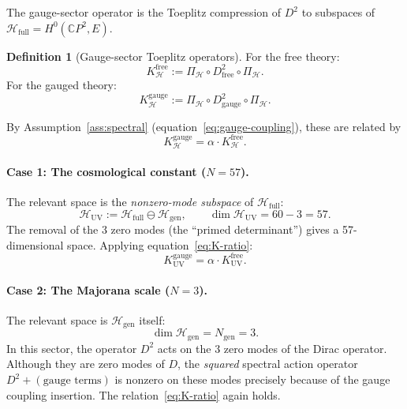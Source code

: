 \documentclass[11pt]{article}
\theoremstyle{definition}
\newtheorem{definition}[theorem]{Definition}
\theoremstyle{remark}
\newcommand{\CP}{\mathbb{C}P}
\begin{document}
The gauge-sector operator is the Toeplitz compression of $D^2$ to
subspaces of $\mathcal{H}_{\mathrm{full}} = H^0(\CP^2, E)$.

\begin{definition}[Gauge-sector Toeplitz operators]
\label{def:gauge-ops}
For the free theory:
\begin{equation}
K^{\mathrm{free}}_{\mathcal{H}} := \Pi_{\mathcal{H}} \circ D^2_{\mathrm{free}}
\circ \Pi_{\mathcal{H}}.
\end{equation}
For the gauged theory:
\begin{equation}
K^{\mathrm{gauge}}_{\mathcal{H}} := \Pi_{\mathcal{H}} \circ D^2_{\mathrm{gauge}}
\circ \Pi_{\mathcal{H}}.
\end{equation}
\end{definition}

By Assumption~\ref{ass:spectral} (equation~\eqref{eq:gauge-coupling}),
these are related by
\begin{equation}
\label{eq:K-ratio}
K^{\mathrm{gauge}}_{\mathcal{H}} = \alpha \cdot K^{\mathrm{free}}_{\mathcal{H}}.
\end{equation}

\paragraph{Case 1: The cosmological constant ($N = 57$).}
The relevant space is the \textit{nonzero-mode subspace} of
$\mathcal{H}_{\mathrm{full}}$:
\begin{equation}
\mathcal{H}_{\mathrm{UV}} := \mathcal{H}_{\mathrm{full}}
\ominus \mathcal{H}_{\mathrm{gen}},
\qquad \dim \mathcal{H}_{\mathrm{UV}} = 60 - 3 = 57.
\end{equation}
The removal of the 3 zero modes (the ``primed determinant'') gives a
57-dimensional space. Applying equation~\eqref{eq:K-ratio}:
\begin{equation}
K^{\mathrm{gauge}}_{\mathrm{UV}} = \alpha \cdot K^{\mathrm{free}}_{\mathrm{UV}}.
\end{equation}

\paragraph{Case 2: The Majorana scale ($N = 3$).}
The relevant space is $\mathcal{H}_{\mathrm{gen}}$ itself:
\begin{equation}
\dim \mathcal{H}_{\mathrm{gen}} = N_{\mathrm{gen}} = 3.
\end{equation}
In this sector, the operator $D^2$ acts on the 3 zero modes of the
Dirac operator. Although they are zero modes of $D$, the
\textit{squared} spectral action operator $D^2 + (\text{gauge
terms})$ is nonzero on these modes precisely because of the gauge
coupling insertion. The relation~\eqref{eq:K-ratio} again holds.
\end{document}
